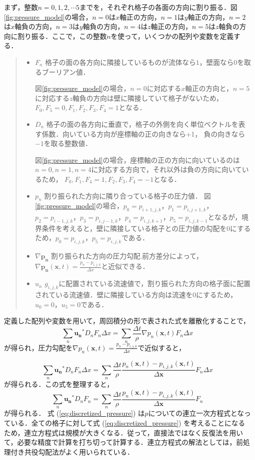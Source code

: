 \documentclass[a4j,12pt]{jreport}
\begin{document}
まず，整数$n=0,1,2,\cdots 5$までを，それぞれ格子の各面の方向に割り振る．図\ref{fig:pressure_model}の場合，$n=0$は$x$軸正の方向，$n=1$は$y$軸正の方向，$n=2$は$x$軸負の方向，$n=3$は$y$軸負の方向，$n=4$は$z$軸正の方向，$n=5$は$z$軸負の方向に割り振る．ここで，この整数$n$を使って，いくつかの配列や変数を定義する．
\begin{quote}
	\begin{itemize}
		\item $F_n$ 格子の面の各方向に隣接しているものが流体なら$1$，壁面なら$0$を取るブーリアン値．
		
		図\ref{fig:pressure_model}の場合，$n=0$に対応する$x$軸正の方向と，$n=5$に対応する$z$軸負の方向は壁に隣接していて格子がないため，$F_0,F_5 = 0,F_1,F_2,F_3,F_4 = 1$となる．
		\item $D_n$ 格子の面の各方向に垂直で，格子の外側を向く単位ベクトルを表す係数．向いている方向が座標軸の正の向きなら+1，					負の向きなら$-1$を取る整数値．
		
		図\ref{fig:pressure_model}の場合，座標軸の正の方向に向いているのは$n=0,n=1,n=4$に対応する方向で，それ以外は負の方向に向いているため，
		$F_0,F_1,F_4 = 1,F_2,F_3,F_4 = -1$となる．
		\item $p_n$ 割り振られた方向に隣り合っている格子の圧力値．
		図\ref{fig:pressure_model}の場合，$p_0 = p_{i+1,j,k}$，$p_1 = p_{i,j+1,k}$，$p_2 = p_{i-1,j,k}$，$p_3 = p_{i,j-1,k}$，$p_4 = p_{i,j,k+1}$，$p_5 = p_{i,j,k-1}$となるが，境界条件を考えると，壁に隣接している格子との圧力値の勾配を$0$にするため，$p_0 = p_{i,j,k}$，$p_5 = p_{i,j,k}$である．
		\item $\nabla\bm{p_n}$ 割り振られた方向の圧力勾配.前方差分によって，$\nabla \bm{p_n} (\bm{x},t)  = \frac{p_n - p_{i,j,k}}{\varDelta x}$と近似できる．
		\item $u_n$ $g_{i,j,k}$に配置されている流速値で，割り振られた方向の格子面に配置されている流速値．壁に隣接している方向は流速を$0$にするため，$u_0 = 0$，$u_5 = 0$である．
	\end{itemize}
\end{quote}

定義した配列や変数を用いて，周回積分の形で表された式を離散化することで，
$$ \sum_{n}\bm{u_n}^*D_nF_n\varDelta x = \sum_{n}\frac{\varDelta t}{\rho}\nabla p_n (\bm{x},t) F_n\varDelta x $$
が得られ，圧力勾配を$\nabla p_n (\bm{x},t)  = \frac{p_n - p_{i,j,k}}{\varDelta x}$で近似すると，

$$ \sum_{n}\bm{u_n}^*D_nF_n\varDelta x = \sum_{n}\frac{\varDelta t}{\rho}\frac{p_n (\bm{x},t) - p_{i,j,k} (\bm{x},t) }{\varDelta \bm{x}}F_n\varDelta x $$
が得られる．この式を整理すると，
\begin{equation}\label{eq:discretized_pressure}
\sum_{n}\bm{u_n}^*D_nF_n= \sum_{n}\frac{\varDelta t}{\rho}\frac{p_n (\bm{x},t)  - p_{i,j,k} (\bm{x},t) }{\varDelta \bm{x}}F_n
\end{equation} 
が得られる．
式 (\ref{eq:discretized_pressure}) は$p$についての連立一次方程式となっている．全ての格子に対して式 (\ref{eq:discretized_pressure}) を考えることになるため，連立方程式は規模が大きくなる．従って，直接法ではなく反復法を用いて，必要な精度で計算を打ち切って計算する．連立方程式の解法としては，前処理付き共役勾配法がよく用いられている．
\end{document}
